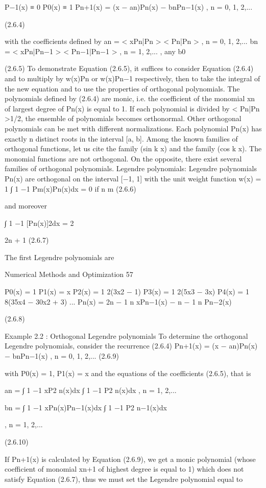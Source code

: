 \documentclass[letterpaper,12pt]{article}
\begin{document}
P−1(x) ≡ 0
P0(x) ≡ 1
Pn+1(x) = (x − an)Pn(x) − bnPn−1(x) , n = 0, 1, 2,...

(2.6.4)

with the coefficients defined by
an = < xPn|Pn >
< Pn|Pn > , n = 0, 1, 2,...
bn = < xPn|Pn−1 >
< Pn−1|Pn−1 > , n = 1, 2,... , any b0

(2.6.5)
To demonstrate Equation (2.6.5), it suffices to consider Equation (2.6.4) and to multiply
by w(x)Pn or w(x)Pn−1 respectively, then to take the integral of the new equation and
to use the properties of orthogonal polynomials.
The polynomials defined by (2.6.4) are monic, i.e. the coefficient of the monomial xn
of largest degree of Pn(x) is equal to 1. If each polynomial is divided by < Pn|Pn >1/2,
the ensemble of polynomials becomes orthonormal.
Other orthogonal polynomials can be met with different normalizations.
Each polynomial Pn(x) has exactly n distinct roots in the interval [a, b].
Among the known families of orthogonal functions, let us cite the family (sin k x)
and the family (cos k x).
The monomial functions are not orthogonal. On the opposite, there exist several
families of orthogonal polynomials.
Legendre polynomials:
Legendre polynomials Pn(x) are orthogonal on the interval [−1, 1] with the unit
weight function w(x) = 1
∫ 1
−1
Pm(x)Pn(x)dx = 0 if n  m (2.6.6)

and moreover

∫ 1
−1
[Pn(x)]2dx = 2

2n + 1 (2.6.7)

The first Legendre polynomials are

Numerical Methods and Optimization 57

P0(x) = 1
P1(x) = x
P2(x) = 1
2(3x2 − 1)
P3(x) = 1
2(5x3 − 3x)
P4(x) = 1
8(35x4 − 30x2 + 3)
...
Pn(x) = 2n − 1 n xPn−1(x) − n − 1 n Pn−2(x)

(2.6.8)

Example 2.2 :
Orthogonal Legendre polynomials
To determine the orthogonal Legendre polynomials, consider the recurrence (2.6.4)
Pn+1(x) = (x − an)Pn(x) − bnPn−1(x) , n = 0, 1, 2,... (2.6.9)

with P0(x) = 1, P1(x) = x and the equations of the coefficients (2.6.5), that is

an =
∫ 1
−1
xP2
n(x)dx
∫ 1
−1
P2
n(x)dx
, n = 1, 2,...

bn =
∫ 1
−1
xPn(x)Pn−1(x)dx
∫ 1
−1
P2
n−1(x)dx

, n = 1, 2,...

(2.6.10)

If Pn+1(x) is calculated by Equation (2.6.9), we get a monic polynomial (whose coefficient of
monomial xn+1 of highest degree is equal to 1) which does not satisfy Equation (2.6.7), thus we must
set the Legendre polynomial equal to
\end{document}
